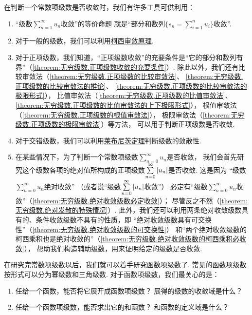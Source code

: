 在判断一个常数项级数是否收敛时，我们有许多工具可供利用：
\begin{enumerate}
\item “级数\(\sum\limits_{n=1}^\infty u_n\)收敛”的等价命题%
就是“部分和数列\(\{ s_n = \sum\limits_{i=1}^n u_i \}\)收敛”.

\item
对于一般的级数，我们可以利用\hyperref[theorem:无穷级数.级数的柯西审敛原理]{柯西审敛原理}.

\item
对于正项级数，我们知道，“正项级数收敛”的充要条件是“它的部分和数列有界”（\cref{theorem:无穷级数.正项级数收敛的充要条件}）.
除此以外，我们还有比较审敛法（\cref{theorem:无穷级数.正项级数的比较审敛法}、%
\cref{theorem:无穷级数.正项级数的比较审敛法的推论}、%
\cref{theorem:无穷级数.正项级数的比较审敛法的极限形式}），
比值审敛法（\cref{theorem:无穷级数.正项级数的比值审敛法}、%
\cref{theorem:无穷级数.正项级数的比值审敛法的上下极限形式}），
根值审敛法（\cref{theorem:无穷级数.正项级数的根值审敛法}），
极限审敛法（\cref{theorem:无穷级数.正项级数的极限审敛法}）等方法，
可以用于判断正项级数是否收敛.

\item
对于交错级数，我们可以利用\hyperref[theorem:无穷级数.莱布尼茨定理]{莱布尼茨定理}判断级数的敛散性.

\item
在某些情况下，为了判断一个常数项级数\(\sum\limits_{n=0}^\infty u_n\)是否收敛，
我们会首先研究这个级数各项的绝对值所构成的正项级数\(\sum\limits_{n=0}^\infty \abs{u_n}\)是否收敛.
这是因为%
“级数\(\sum\limits_{n=0}^\infty u_n\)绝对收敛”%
（或者说“级数\(\sum\limits_{n=0}^\infty \abs{u_n}\)收敛”）%
必定有“级数\(\sum\limits_{n=0}^\infty u_n\)收敛”（\cref{theorem:无穷级数.绝对收敛级数必定收敛}）；
尽管反之不然（\cref{theorem:无穷级数.绝对发散的特殊情况}）.
此外，我们还可以利用两条绝对收敛级数具有的、条件收敛级数不具有的性质，即%
“绝对收敛级数具有可交换性”（\cref{theorem:无穷级数.绝对收敛级数的可交换性}）%
和“两个绝对收敛级数的柯西乘积也是绝对收敛的”（\cref{theorem:无穷级数.绝对收敛级数的柯西乘积必收敛}），
帮助我们构造辅助级数，用来证明给定的级数是否收敛.
\end{enumerate}

在研究完常数项级数以后，我们就可以着手研究函数项级数了.
常见的函数项级数按形式可以分为幂级数和三角级数.
对于函数项级数，我们最关心的是：
\begin{enumerate}
\item 任给一个函数，能否将它展开成函数项级数？
 展得的级数的收敛域是什么？
\item 任给一个函数项级数，能否求出它的和函数？
 和函数的定义域是什么？
\end{enumerate}

